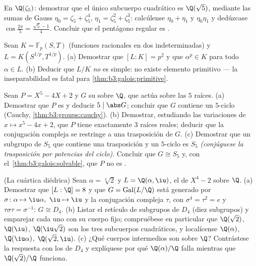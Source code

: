 \begin{exercise}[$\star\star$]\label{exo:b3:galois:9}
En $\Q(\zeta_5)$: demostrar que el único subcuerpo cuadrático es
$\Q(\sqrt5)$, mediante las sumas de Gauss
$\eta_0 = \zeta_5 + \zeta_5^4$, $\eta_1 = \zeta_5^2 + \zeta_5^3$:
calcúlense $\eta_0 + \eta_1$ y $\eta_0\eta_1$ y dedúzcase
$\cos\frac{2\pi}5 = \frac{\sqrt5 -
1}4$. Concluir que el pentágono regular es
.
\end{exercise}

\begin{exercise}[$\star\star\star$]\label{exo:b3:galois:10}
Sean $K = \mathbb F_p(S, T)$ (funciones racionales en dos
indeterminadas) y $L = K(S^{1/p}, T^{1/p})$. (a) Demostrar que
$[L:K] = p^2$ y que $\alpha^p \in K$ para todo
$\alpha \in L$.
(b) Deducir que $L/K$ \emph{no} es simple: no existe elemento primitivo
--- la inseparabilidad es fatal para
\cref{thm:b3:galois:primitive}.
\end{exercise}

\begin{exercise}[$\star\star\star$]\label{exo:b3:galois:11}
Sean $P = X^5 - 4X + 2$ y $G$ su  sobre $\Q$, que actúa sobre las $5$ raíces. (a) Demostrar que
$P$ es  y deducir
$5 \mid \abs G$; concluir que $G$ contiene un $5$-ciclo (Cauchy,
\cref{thm:b3:groups:cauchy}).
(b) Demostrar, estudiando las variaciones de $x \mapsto x^5 - 4x +
2$, que $P$ tiene exactamente $3$ raíces reales; deducir que la
conjugación compleja se restringe a una trasposición de $G$. (c)
Demostrar que un subgrupo de $S_5$ que contiene una trasposición y un
$5$-ciclo es $S_5$ \emph{(conjúguese la trasposición por potencias del
ciclo)}. Concluir que $G \cong S_5$ y, con
el~\cref{thm:b3:galois:solvable}, que $P$ no es
.
\end{exercise}

\begin{exercise}[$\star\star\star$]\label{exo:b3:galois:12}
(La cuártica diédrica) Sean $\alpha = \sqrt[4]2$ y $L =
\Q(\alpha, \iu)$, el  de $X^4 - 2$ sobre $\Q$. (a) Demostrar que
$[L : \Q] = 8$ y que $G =
\operatorname{Gal}(L/\Q)$ está generado por $\sigma\colon
\alpha \mapsto \iu\alpha,\ \iu \mapsto \iu$ y la conjugación compleja
$\tau$, con $\sigma^4 = \tau^2 = e$ y
$\tau\sigma\tau = \sigma^{-1}$: $G \cong D_4$.
(b) Listar el retículo de subgrupos de $D_4$ (diez subgrupos) y
emparejar cada uno con su cuerpo fijo; compruébese en particular que
$\Q(\sqrt2)$, $\Q(\iu)$, $\Q(\iu\sqrt2)$ son los tres subcuerpos
cuadráticos, y localícense $\Q(\alpha)$,
$\Q(\iu\alpha)$, $\Q(\sqrt2, \iu)$.
(c) ¿Qué cuerpos intermedios son  sobre $\Q$? Contrástese la respuesta con los
 de $D_4$ y explíquese
por qué $\Q(\alpha)/\Q$ falla mientras que $\Q(\sqrt2)/\Q$ funciona.
\end{exercise}

